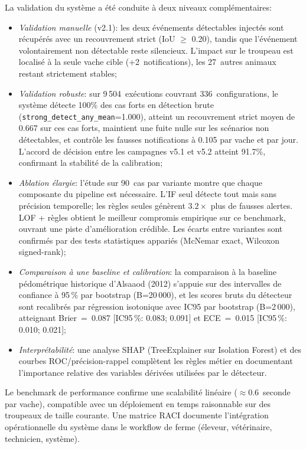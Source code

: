 \begin{conclusion}
La validation du système a été conduite à deux niveaux complémentaires:
\begin{itemize}
    \item \textit{Validation manuelle} (v2.1): les deux événements détectables injectés sont
    récupérés avec un recouvrement strict (IoU $\geq$ 0.20), tandis que l'événement
    volontairement non détectable reste silencieux. L'impact sur le troupeau est localisé à
    la seule vache cible (+2~notifications), les 27~autres animaux restant strictement
    stables;
    \item \textit{Validation robuste}: sur 9\,504~exécutions couvrant 336~configurations,
    le système détecte 100\% des cas forts en détection brute
    (\texttt{strong\_detect\_any\_mean}=1.000), atteint un recouvrement strict moyen de
    0.667 sur ces cas forts, maintient une fuite nulle sur les scénarios non détectables,
    et contrôle les fausses notifications à 0.105 par vache et par jour. L'accord de décision entre les campagnes v5.1 et v5.2 atteint
    91.7\%, confirmant la stabilité de la calibration;
    \item \textit{Ablation élargie}: l'étude sur 90~cas par variante montre que chaque
    composante du pipeline est nécessaire. L'IF seul détecte tout mais sans précision
    temporelle; les règles seules génèrent $3.2\times$ plus de fausses alertes. LOF + règles
    obtient le meilleur compromis empirique sur ce benchmark, ouvrant une piste
    d'amélioration crédible. Les écarts entre variantes sont confirmés par des tests
    statistiques appariés (McNemar exact, Wilcoxon signed-rank);
    \item \textit{Comparaison à une baseline et calibration}: la comparaison à la
    baseline pédométrique historique d'Alsaaod (2012) s'appuie sur des
    intervalles de confiance à 95\,\% par bootstrap (B=20\,000), et les scores
    bruts du détecteur sont recalibrés par régression isotonique avec IC95 par bootstrap
    (B=2\,000), atteignant Brier~=~0.087 [IC95\,\%: 0.083; 0.091] et
    ECE~=~0.015 [IC95\,\%: 0.010; 0.021];
    \item \textit{Interprétabilité}: une analyse SHAP (TreeExplainer sur Isolation Forest)
    et des courbes ROC/précision-rappel complètent les règles métier en documentant
    l'importance relative des variables dérivées utilisées par le détecteur.
\end{itemize}

Le benchmark de performance confirme une scalabilité linéaire ($\approx$0.6~seconde par
vache), compatible avec un déploiement en temps raisonnable sur des troupeaux de taille
courante. Une matrice RACI documente l'intégration opérationnelle du système dans le
workflow de ferme (éleveur, vétérinaire, technicien, système).


\end{conclusion}
